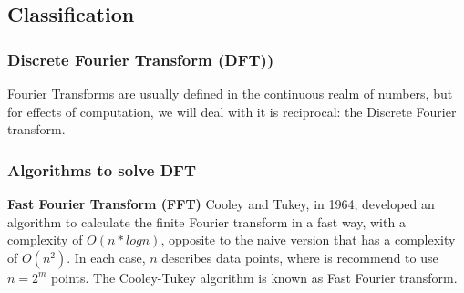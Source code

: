 \subsection{Classification}

\subsubsection{Discrete Fourier Transform (DFT))}



Fourier Transforms are usually defined in the continuous realm of numbers, but for effects of computation, we will deal with it is reciprocal: the Discrete Fourier transform.

\subsubsection{Algorithms to solve DFT}

\textbf{Fast Fourier Transform (FFT)}   
\noindent
Cooley and Tukey, in 1964, developed an algorithm to calculate the finite Fourier transform in a fast way, with a complexity of $O(n*logn)$, opposite to the naive version that has a complexity of $O(n^2)$. In each case, $n$ describes data points, where is recommend to use $n = 2^m$ points. The Cooley-Tukey algorithm is known as Fast Fourier transform. \\

\begin{comment}
\noindent
Next we present the pseudocode for FFT on listing \ref{related-works-listing-fft-pseudocode} and the implementation on listing \ref{related-works-listing-fft-implementation}:





\bigskip \noindent
\textbf{Sparse Fast Fourier Transform}
\noindent
\end{comment}
